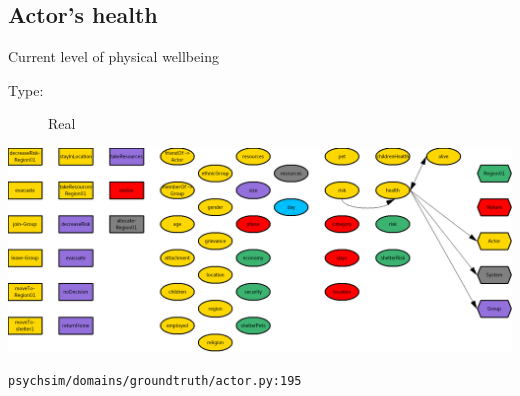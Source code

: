\documentclass{article}%
\begin{document}
\subsection{Actor's health}%
\label{subsec:Actor's health}%
Current level of physical wellbeing%
\begin{description}%
\item[Type:]%
Real%
\end{description}%
\includegraphics[width=\textwidth]{images/healthOfActor.png}%
\begin{flushleft}%
\verb|psychsim/domains/groundtruth/actor.py:195|%
\end{flushleft}%
\end{document}
